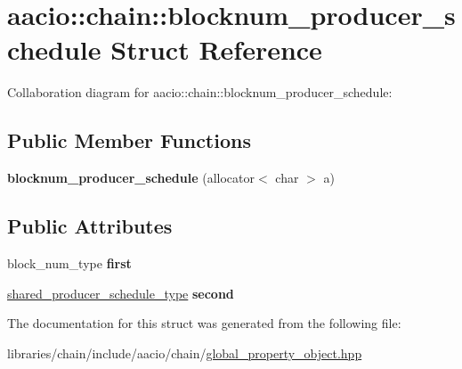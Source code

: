 \hypertarget{structaacio_1_1chain_1_1blocknum__producer__schedule}{}\section{aacio\+:\+:chain\+:\+:blocknum\+\_\+producer\+\_\+schedule Struct Reference}
\label{structaacio_1_1chain_1_1blocknum__producer__schedule}


Collaboration diagram for aacio\+:\+:chain\+:\+:blocknum\+\_\+producer\+\_\+schedule\+:
\subsection*{Public Member Functions}
\begin{DoxyCompactItemize}
\item 
\mbox{\label{structaacio_1_1chain_1_1blocknum__producer__schedule_a7f4b12058c874ec51c917854c94640b7}} 
{\bfseries blocknum\+\_\+producer\+\_\+schedule} (allocator$<$ char $>$ a)
\end{DoxyCompactItemize}
\subsection*{Public Attributes}
\begin{DoxyCompactItemize}
\item 
\mbox{\label{structaacio_1_1chain_1_1blocknum__producer__schedule_a99470d32360a4323a4608457d5291208}} 
block\+\_\+num\+\_\+type {\bfseries first}
\item 
\mbox{\label{structaacio_1_1chain_1_1blocknum__producer__schedule_a39f225ef95c4c10582ebf1b56e19ca3f}} 
\mbox{\hyperlink{structaacio_1_1chain_1_1shared__producer__schedule__type}{shared\+\_\+producer\+\_\+schedule\+\_\+type}} {\bfseries second}
\end{DoxyCompactItemize}


The documentation for this struct was generated from the following file\+:\begin{DoxyCompactItemize}
\item 
libraries/chain/include/aacio/chain/\mbox{\hyperlink{global__property__object_8hpp}{global\+\_\+property\+\_\+object.\+hpp}}\end{DoxyCompactItemize}
